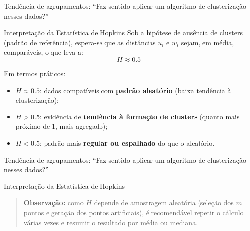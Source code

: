 \documentclass[
  ignorenonframetext,
  aspectratio=169,
]{beamer}
\providecommand{\tightlist}{%
  \setlength{\itemsep}{0pt}\setlength{\parskip}{0pt}}
\begin{document}
\begin{frame}{Tendência de agrupamentos: ``Faz sentido aplicar um
algoritmo de clusterização nesses dados?''}
\protect{}\label{tenduxeancia-de-agrupamentos-faz-sentido-aplicar-um-algoritmo-de-clusterizauxe7uxe3o-nesses-dados-5}
\begin{block}{Interpretação da Estatística de Hopkins}
\protect{}\label{interpretauxe7uxe3o-da-estatuxedstica-de-hopkins}
Sob a hipótese de ausência de clusters (padrão de referência), espera-se
que as distâncias \(u_i\) e \(w_i\) sejam, em média, comparáveis, o que
leva a: \[
H \approx 0.5
\]

Em termos práticos:

\begin{itemize}
\tightlist
\item
  \(H \approx 0.5\): dados compatíveis com \textbf{padrão aleatório}
  (baixa tendência à clusterização);
\item
  \(H > 0.5\): evidência de \textbf{tendência à formação de clusters}
  (quanto mais próximo de 1, mais agregado);
\item
  \(H < 0.5\): padrão mais \textbf{regular ou espalhado} do que o
  aleatório.
\end{itemize}
\end{block}
\end{frame}

\begin{frame}{Tendência de agrupamentos: ``Faz sentido aplicar um
algoritmo de clusterização nesses dados?''}
\protect{}\label{tenduxeancia-de-agrupamentos-faz-sentido-aplicar-um-algoritmo-de-clusterizauxe7uxe3o-nesses-dados-6}
\begin{block}{Interpretação da Estatística de Hopkins}
\protect{}\label{interpretauxe7uxe3o-da-estatuxedstica-de-hopkins-1}
\begin{quote}
\textbf{Observação:} como \(H\) depende de amostragem aleatória (seleção
dos \(m\) pontos e geração dos pontos artificiais), é recomendável
repetir o cálculo várias vezes e resumir o resultado por média ou
mediana.
\end{quote}
\end{block}
\end{frame}
\end{document}
